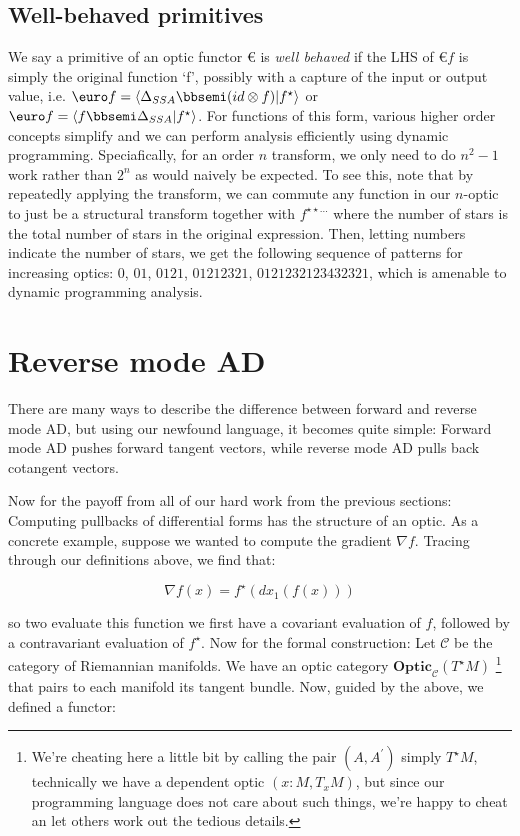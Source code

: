 \documentclass[letterpaper, 10 pt, conference]{ieeeconf}  %
\newcommand{\Optic}{\textbf{Optic}}
\begin{document}
\subsection{Well-behaved primitives}

We say a primitive of an optic functor $\euro$ is \textit{well behaved} if the
LHS of $\euro f$ is simply the original function `f', possibly with a capture
of the input or output value, i.e. $\euro f = \langle \Delta_{SSA} \bbsemi
(id \otimes f) | f^\star \rangle$ or $\euro f = \langle f \bbsemi \Delta_{SSA} | f^\star \rangle$.
For functions of this form, various higher order concepts simplify and we can
perform analysis efficiently using dynamic programming. Speciafically, for an
order $n$ transform, we only need to do $n^2 - 1$ work rather than $2^n$ as would
naively be expected. To see this, note that by repeatedly applying the transform,
we can commute any function in our $n$-optic to just be a structural transform
together with $f^{\star\star\ldots}$ where the number of stars is the total
number of stars in the original expression. Then, letting numbers indicate
the number of stars, we get the following sequence of patterns for
increasing optics: $0$, $01$, $0121$, $01212321$, $0121232123432321$, which
is amenable to dynamic programming analysis.


\section{Reverse mode AD}

There are many ways to describe the difference between forward and reverse mode
AD, but using our newfound language, it becomes quite simple: Forward mode AD
pushes forward tangent vectors, while reverse mode AD pulls back cotangent vectors.

Now for the payoff from all of our hard work from the previous sections: Computing
pullbacks of differential forms has the structure of an optic. As a concrete
example, suppose we wanted to compute the gradient $\nabla f$. Tracing through our
definitions above, we find that:

\begin{equation}
\nabla f (x) = f^\star(dx_1(f(x)))
\end{equation}

so two evaluate this function we first have a covariant evaluation of $f$,
followed by a contravariant evaluation of $f^\star$. Now for the formal construction:
Let $\mathcal{C}$ be the category of Riemannian manifolds. We have an optic
category $\Optic_{\mathcal{C}}(T^\star M)$
\footnote{We're cheating here a little bit by calling the pair $(A,A^\prime)$ simply $T^\star M$,
technically we have a dependent optic $(x: M, T_x M)$, but since our programming
language does not care about such things, we're happy to cheat an let others work out the tedious details.}
that pairs to each manifold its
tangent bundle. Now, guided by the above, we defined a functor:
\end{document}
